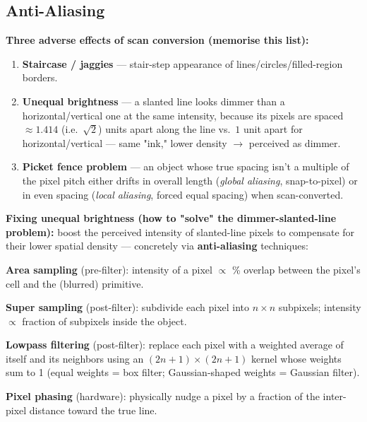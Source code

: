 \documentclass[12pt, a4paper]{article}
\newenvironment{answerbox}{\begin{mdframed}[style=answerframe]}{\end{mdframed}}
\begin{document}
\subsection{Anti-Aliasing}
\begin{answerbox}
\textbf{Three adverse effects of scan conversion (memorise this list):}
\begin{enumerate}[noitemsep]
  \item \textbf{Staircase / jaggies} --- stair-step appearance of lines/circles/filled-region borders.
  \item \textbf{Unequal brightness} --- a slanted line looks dimmer than a horizontal/vertical one at the same intensity, because its pixels are spaced $\approx\!1.414$ (i.e.\ $\sqrt2$) units apart along the line vs.\ $1$ unit apart for horizontal/vertical --- same "ink," lower density $\to$ perceived as dimmer.
  \item \textbf{Picket fence problem} --- an object whose true spacing isn't a multiple of the pixel pitch either drifts in overall length (\emph{global aliasing}, snap-to-pixel) or in even spacing (\emph{local aliasing}, forced equal spacing) when scan-converted.
\end{enumerate}
\end{answerbox}
\textbf{Fixing unequal brightness (how to "solve" the dimmer-slanted-line problem):} boost the perceived intensity of slanted-line pixels to compensate for their lower spatial density --- concretely via \textbf{anti-aliasing} techniques:
\begin{keypoints}
  \item \textbf{Area sampling} (pre-filter): intensity of a pixel $\propto$ \% overlap between the pixel's cell and the (blurred) primitive.
  \item \textbf{Super sampling} (post-filter): subdivide each pixel into $n\times n$ subpixels; intensity $\propto$ fraction of subpixels inside the object.
  \item \textbf{Lowpass filtering} (post-filter): replace each pixel with a weighted average of itself and its neighbors using an $(2n{+}1)\times(2n{+}1)$ kernel whose weights sum to 1 (equal weights = box filter; Gaussian-shaped weights = Gaussian filter).
  \item \textbf{Pixel phasing} (hardware): physically nudge a pixel by a fraction of the inter-pixel distance toward the true line.
\end{keypoints}
\end{document}
